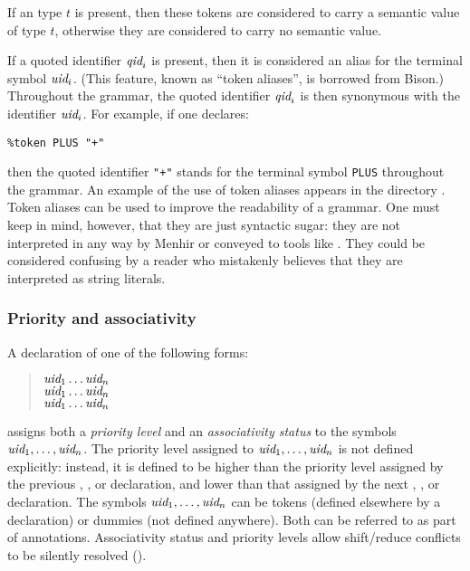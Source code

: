 \documentclass[onecolumn,11pt,nocopyrightspace,preprint]{sigplanconf}
\begin{document}
If an \ocaml type $t$ is present, then these tokens are considered to carry a
semantic value of type $t$, otherwise they are considered to carry no semantic
value.

If a quoted identifier $\textit{qid}_i$ is present, then it is considered an alias
for the terminal symbol $\textit{uid}_i$. (This feature, known as ``token
aliases'', is borrowed from Bison.)
Throughout the grammar, the quoted identifier $\textit{qid}_i$ is then
synonymous with the identifier $\textit{uid}_i$.
%
For example, if one declares:
\begin{verbatim}
%token PLUS "+"
\end{verbatim}
then the quoted identifier \texttt{"+"} stands for the terminal symbol
\texttt{PLUS} throughout the grammar. An example of the use of token aliases
appears in the directory .
%
Token aliases can be used to improve the readability of a grammar. One must
keep in mind, however, that they are just syntactic sugar: they are not
interpreted in any way by Menhir or conveyed to tools like \ocamllex.
%
They could be considered confusing by a reader who mistakenly believes that
they are interpreted as string literals.

\subsubsection{Priority and associativity}
\label{sec:assoc}

A declaration of one of the following forms:
\begin{quote}
\dnonassoc $\textit{uid}_1 \ldots \textit{uid}_n$ \\
\dleft $\textit{uid}_1 \ldots \textit{uid}_n$ \\
\dright $\textit{uid}_1 \ldots \textit{uid}_n$
\end{quote}
assigns both a \emph{priority level} and an \emph{associativity status} to
the symbols $\textit{uid}_1, \ldots, \textit{uid}_n$. The priority level assigned to
$\textit{uid}_1, \ldots, \textit{uid}_n$ is not defined explicitly: instead, it is
defined to be higher than the priority level assigned by the previous
\dnonassoc, \dleft, or \dright declaration, and lower than that assigned by the next
\dnonassoc, \dleft, or \dright declaration. The symbols $\textit{uid}_1, \ldots, \textit{uid}_n$
can be tokens (defined elsewhere by a \dtoken declaration) or dummies (not
defined anywhere). Both can be referred to as part of \dprec annotations.
Associativity status and priority levels allow shift/reduce conflicts to be
silently resolved ().
\end{document}
